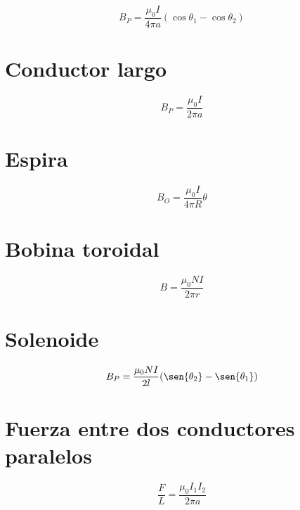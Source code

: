 \documentclass[a4, 12pt]{report}
\begin{document}
    \begin{equation*}
      B_P=\frac{\mu_0I}{4\pi a}(\cos{\theta_1}-\cos{\theta_2})
    \end{equation*}

    \section*{Conductor largo}

      \begin{equation*}
        B_P=\frac{\mu_0I}{2\pi a}
      \end{equation*}

    \section*{Espira}

      \begin{equation*}
        B_O=\frac{\mu_0I}{4\pi R}\theta
      \end{equation*}

    \section*{Bobina toroidal}

      \begin{equation*}
        B=\frac{\mu_0NI}{2\pi r}
      \end{equation*}

    \section*{Solenoide}

      \begin{equation*}
        B_P=\frac{\mu_0NI}{2l}(\sen{\theta_2}-\sen{\theta_1})
      \end{equation*}

    \section*{Fuerza entre dos conductores paralelos}

      \begin{equation*}
        \frac{F}{L}=\frac{\mu_0 I_1I_2}{2\pi a}
      \end{equation*}
\end{document}
